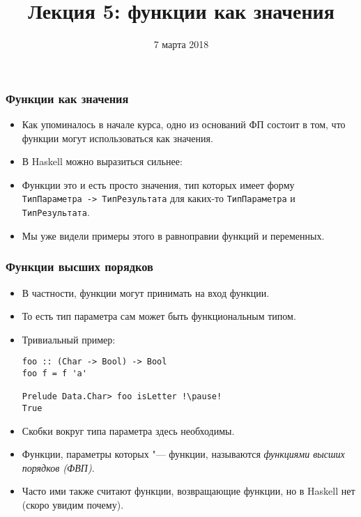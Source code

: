 \documentclass[10pt]{beamer}
\title{Лекция 5: функции как значения}
\date{7 марта 2018}
\begin{document}
\begin{frame}[plain]
\maketitle
\end{frame}

\begin{frame}[fragile]
\frametitle{Функции как значения}
\begin{itemize}
    \item Как упоминалось в начале курса, одно из оснований ФП состоит в том, что функции могут использоваться как значения.
    \item В Haskell можно выразиться сильнее:\pause
    \item Функции это и есть просто значения, тип которых имеет форму \lstinline|ТипПараметра -> ТипРезультата| для каких-то \lstinline|ТипПараметра| и \lstinline|ТипРезультата|.\pause
    \item Мы уже видели примеры этого в равноправии функций и переменных.
\end{itemize}
\end{frame}

\begin{frame}[fragile]
\frametitle{Функции высших порядков}
\begin{itemize}
    \item В частности, функции могут принимать на вход функции.
    \item То есть тип параметра сам может быть функциональным типом. 
    \item Тривиальный пример:
\begin{lstlisting}
foo :: (Char -> Bool) -> Bool
foo f = f 'a'

Prelude Data.Char> foo isLetter !\pause!
True
\end{lstlisting} 
    \item Скобки вокруг типа параметра здесь необходимы.\pause
    \item Функции, параметры которых "--- функции, называются \emph{функциями высших порядков (ФВП)}.\pause
    \item Часто ими также считают функции, возвращающие функции, но в Haskell нет (скоро увидим почему).
\end{itemize}
\end{frame}
\end{document}
